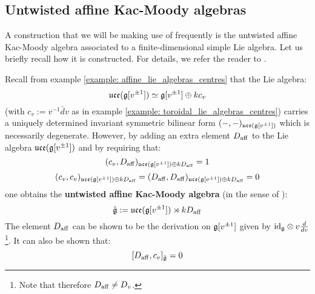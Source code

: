     \subsection{Untwisted affine Kac-Moody algebras} \label{subsection: a_fixed_untwisted_affine_kac_moody_algebra}
        A construction that we will be making use of frequently is the untwisted affine Kac-Moody algebra associated to a finite-dimensional simple Lie algebra. Let us briefly recall how it is constructed. For details, we refer the reader to \cite[Chapters 6 and 7]{kac_infinite_dimensional_lie_algebras}.

        Recall from example \ref{example: affine_lie_algebras_centres} that the Lie algebra:
            $$\mathfrak{uce}(\mathfrak{g}[v^{\pm 1}]) \simeq \mathfrak{g}[v^{\pm 1}] \oplus k c_v$$
        (with $c_v := v^{-1} \bar{d}v$ as in example \ref{example: toroidal_lie_algebras_centres}) carries a uniquely determined invariant symmetric bilinear form $(-, -)_{\mathfrak{uce}(\mathfrak{g}[v^{\pm 1}])}$ which is necessarily degenerate. However, by adding an extra element $D_{\mathrm{aff}}$ to the Lie algebra $\mathfrak{uce}(\mathfrak{g}[v^{\pm 1}])$ and by requiring that:
            $$(c_v, D_{\mathrm{aff}})_{\mathfrak{uce}(\mathfrak{g}[v^{\pm 1}]) \oplus k D_{\mathrm{aff}}} = 1$$
            $$(c_v, c_v)_{\mathfrak{uce}(\mathfrak{g}[v^{\pm 1}]) \oplus k D_{\mathrm{aff}}} = (D_{\mathrm{aff}}, D_{\mathrm{aff}})_{\mathfrak{uce}(\mathfrak{g}[v^{\pm 1}]) \oplus k D_{\mathrm{aff}}} = 0$$
        one obtains the \textbf{untwisted affine Kac-Moody algebra} (in the sense of \cite[Chapter 7]{kac_infinite_dimensional_lie_algebras}):
            $$\hat{\mathfrak{g}} := \mathfrak{uce}(\mathfrak{g}[v^{\pm 1}]) \rtimes k D_{\mathrm{aff}}$$
        The element $D_{\mathrm{aff}}$ can be shown to be the derivation on $\mathfrak{g}[v^{\pm 1}]$ given by $\id_{\g} \tensor v \frac{d}{dv}$\footnote{Note that therefore $D_{\mathrm{aff}} \not = D_v$.}. It can also be shown that:
            $$[D_{\mathrm{aff}}, c_v]_{\hat{\mathfrak{g}}} = 0$$

